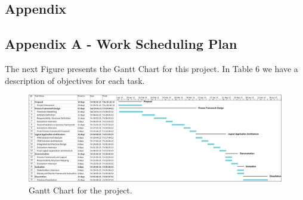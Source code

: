 
\begin{landscape}

\section{Appendix} %
\label{sec:attachments}


\subsection{Appendix A - Work Scheduling Plan} 

The next Figure presents the Gantt Chart for this project. In Table 6 we have a description of objectives for each task.



\begin{figure}[h!]
\centering
\includegraphics[height=0.55\textheight]{img/GanttChart.png}
\caption{Gantt Chart for the project.}
\end{figure}

\end{landscape}

\newpage



